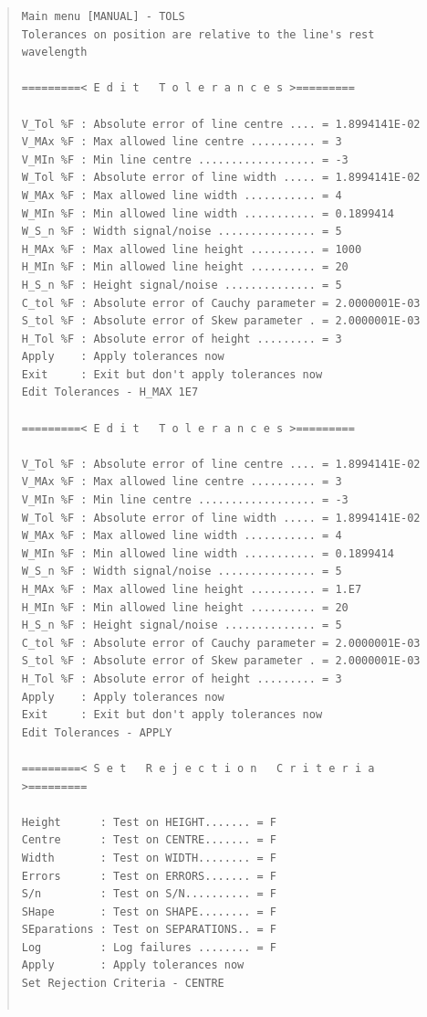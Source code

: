 \begin{quote}\begin{verbatim}
Main menu [MANUAL] - TOLS
Tolerances on position are relative to the line's rest wavelength
 
=========< E d i t   T o l e r a n c e s >=========
 
V_Tol %F : Absolute error of line centre .... = 1.8994141E-02
V_MAx %F : Max allowed line centre .......... = 3
V_MIn %F : Min line centre .................. = -3
W_Tol %F : Absolute error of line width ..... = 1.8994141E-02
W_MAx %F : Max allowed line width ........... = 4
W_MIn %F : Min allowed line width ........... = 0.1899414
W_S_n %F : Width signal/noise ............... = 5
H_MAx %F : Max allowed line height .......... = 1000
H_MIn %F : Min allowed line height .......... = 20
H_S_n %F : Height signal/noise .............. = 5
C_tol %F : Absolute error of Cauchy parameter = 2.0000001E-03
S_tol %F : Absolute error of Skew parameter . = 2.0000001E-03
H_Tol %F : Absolute error of height ......... = 3
Apply    : Apply tolerances now
Exit     : Exit but don't apply tolerances now
Edit Tolerances - H_MAX 1E7
 
=========< E d i t   T o l e r a n c e s >=========
 
V_Tol %F : Absolute error of line centre .... = 1.8994141E-02
V_MAx %F : Max allowed line centre .......... = 3
V_MIn %F : Min line centre .................. = -3
W_Tol %F : Absolute error of line width ..... = 1.8994141E-02
W_MAx %F : Max allowed line width ........... = 4
W_MIn %F : Min allowed line width ........... = 0.1899414
W_S_n %F : Width signal/noise ............... = 5
H_MAx %F : Max allowed line height .......... = 1.E7
H_MIn %F : Min allowed line height .......... = 20
H_S_n %F : Height signal/noise .............. = 5
C_tol %F : Absolute error of Cauchy parameter = 2.0000001E-03
S_tol %F : Absolute error of Skew parameter . = 2.0000001E-03
H_Tol %F : Absolute error of height ......... = 3
Apply    : Apply tolerances now
Exit     : Exit but don't apply tolerances now
Edit Tolerances - APPLY
 
=========< S e t   R e j e c t i o n   C r i t e r i a >=========
 
Height      : Test on HEIGHT....... = F
Centre      : Test on CENTRE....... = F
Width       : Test on WIDTH........ = F
Errors      : Test on ERRORS....... = F
S/n         : Test on S/N.......... = F
SHape       : Test on SHAPE........ = F
SEparations : Test on SEPARATIONS.. = F
Log         : Log failures ........ = F
Apply       : Apply tolerances now
Set Rejection Criteria - CENTRE
 

\end{verbatim}
\end{quote}
